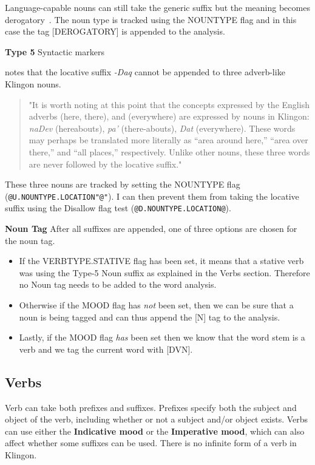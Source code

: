 \documentclass[11pt]{article}
\begin{document}
Language-capable nouns can still take the generic suffix but the meaning becomes derogatory~\cite{Okrand:92}. The noun type is tracked using the NOUNTYPE flag and in this case the tag [DEROGATORY] is appended to the analysis.

\textbf{Type 5} Syntactic markers

\cite{Okrand:92} notes that the locative suffix \textit{-Daq} cannot be appended to three adverb-like Klingon nouns.

\begin{quote}
"It is worth noting at this point that the concepts expressed by the English adverbs (here, there), and (everywhere) are expressed by nouns in Klingon: \textit{naDev} (hereabouts), \textit{pa'} (there-abouts), \textit{Dat} (everywhere). These words may perhaps be translated more literally as ``area around here,'' ``area over there,'' and ``all places,'' respectively. Unlike other nouns, these three words are never followed by the locative suffix."
\end{quote}

These three nouns are tracked by setting the NOUNTYPE flag (\texttt{@U.NOUNTYPE.LOCATION"@"}). I can then prevent them from taking the locative suffix using the Disallow flag test (\texttt{@D.NOUNTYPE.LOCATION@}).

\textbf{Noun Tag}
After all suffixes are appended, one of three options are chosen for the noun tag.
\begin{itemize}
	\item If the VERBTYPE.STATIVE flag has been set, it means that a stative verb was using the Type-5 Noun suffix as explained in the Verbs section. Therefore no Noun tag needs to be added to the word analysis.
	\item Otherwise if the MOOD flag has \textit{not} been set, then we can be sure that a noun is being tagged and can thus append the [N] tag to the analysis.
	\item Lastly, if the MOOD flag \textit{has} been set then we know that the word stem is a verb and we tag the current word with [DVN].
\end{itemize}

\subsection {Verbs}

Verb can take both prefixes and suffixes. Prefixes specify both the subject and object of the verb, including whether or not a subject and/or object exists. Verbs can use either the \textbf{Indicative mood} or the \textbf{Imperative mood}, which can also affect whether some suffixes can be used. There is no infinite form of a verb in Klingon.
\end{document}
